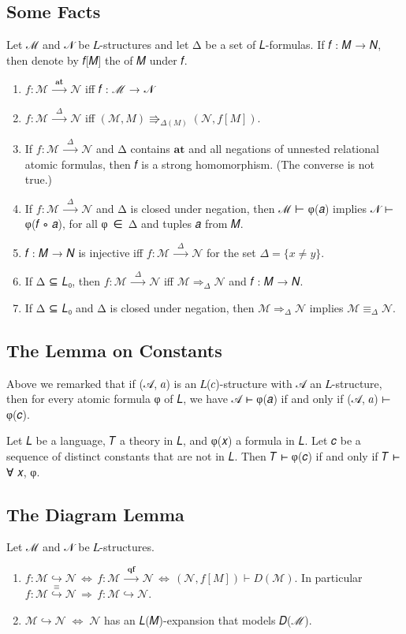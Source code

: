 \documentclass[a4paper,UKenglish,cleveref,autoref,thm-restate,12pt]{lipics-v2021-wjd}
\newcommand{\<}{\langle}
\renewcommand{\>}{\rangle}
\begin{document}
\subsection{Some Facts}\label{some-facts}
Let ℳ and 𝒩 be 𝐿-structures and let Δ be a set of 𝐿-formulas.  If 𝑓 : 𝑀 → 𝑁,
then denote by 𝑓[𝑀] the  of 𝑀 under 𝑓.
\begin{enumerate}
\item 
  \(f : ℳ \stackrel{\mathbf{at}}{⟶} 𝒩\) iff 𝑓 : ℳ → 𝒩
\item 
 \(f : ℳ \stackrel{Δ}{⟶} 𝒩\) iff \((ℳ, M) \Rrightarrow_{Δ(M)} (𝒩, f[M])\).
\item If \(f : ℳ \stackrel{Δ}{⟶} 𝒩\) and Δ contains \(\mathbf{at}\) and all
  negations of unnested relational atomic formulas, then 𝑓 is a strong
  homomorphism. (The converse is not true.)
\item If \(f : ℳ \stackrel{Δ}{⟶} 𝒩\) and Δ is closed under negation, then
  ℳ ⊢ φ(𝑎) implies 𝒩 ⊢ φ(𝑓 ∘ 𝑎), for all φ~∈~Δ and tuples 𝑎 from 𝑀.
\item 𝑓 : 𝑀 → 𝑁 is injective iff \(f : ℳ \stackrel{Δ}{⟶} 𝒩\)
for the set \(Δ = \{x \neq y\}\).
\item If Δ ⊆ 𝐿₀, then \(f : ℳ \stackrel{Δ}{⟶} 𝒩\) iff \(ℳ ⇒_Δ 𝒩\) and
𝑓 : 𝑀 → 𝑁.
\item If Δ ⊆ 𝐿₀ and Δ is closed under negation, then \(ℳ ⇒_Δ 𝒩\) implies \(ℳ ≡_Δ 𝒩\).
\end{enumerate}


\subsection{The Lemma on Constants}\label{the-lemma-on-constants}

Above we remarked that if (𝒜, 𝑎) is an 𝐿(𝑐)-structure with 𝒜 an 𝐿-structure,
then for every atomic formula φ of 𝐿, we have 𝒜 ⊢ φ(𝑎) if and only if (𝒜, 𝑎) ⊢ φ(𝑐).

\begin{lemma} Let 𝐿 be a language, 𝑇 a
theory in 𝐿, and φ(𝑥) a formula in 𝐿. Let 𝑐 be a sequence of distinct constants
that are not in 𝐿. Then 𝑇 ⊢ φ(𝑐) if and only if 𝑇 ⊢ ∀ 𝑥, φ.
\end{lemma}

\subsection{The Diagram Lemma}\label{the-diagram-lemma}

\begin{lemma}
  Let ℳ and 𝒩 be 𝐿-structures.
  \begin{enumerate}
  \item
    \(𝑓 : ℳ ↪ 𝒩 \, ⇔ \, 𝑓 : ℳ \stackrel{\mathbf{qf}}{⟶} 𝒩
                  \, ⇔ \, (𝒩, 𝑓[M]) ⊢ 𝐷(ℳ)\).
    In particular \(f : ℳ \stackrel{≡}{↪} 𝒩  \, ⇒  \, f : ℳ ↪ 𝒩\).
  \item
    \(ℳ ↪ 𝒩 \; ⇔ \; 𝒩\) has an 𝐿(𝑀)-expansion that models 𝐷(ℳ).
  \end{enumerate}
\end{lemma}
\end{document}
